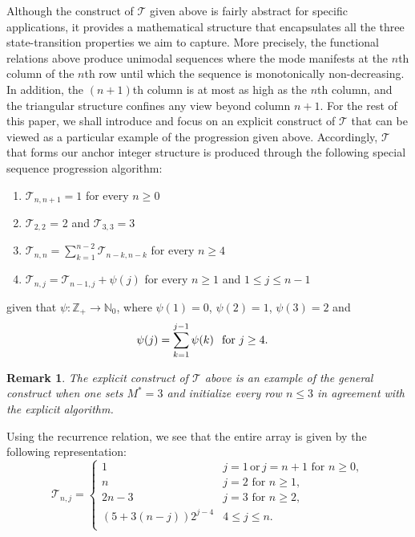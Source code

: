 \documentclass[a4paper,12pt]{article}
\newtheorem{rem}[thm]{Remark}
\def\N{\mathbb{N}}
\def\Z{\mathbb{Z}}
\def\T{\mathcal{T}}
\begin{document}
Although the construct of $\T$ given above is fairly abstract for specific applications, it provides a mathematical structure that encapsulates all the three state-transition properties we aim to capture. More precisely, the functional relations above produce unimodal sequences where the mode manifests at the $n$th column of the $n$th row until which the sequence is monotonically non-decreasing. In addition, the $(n+1)$th column is at most as high as the $n$th column, and the triangular structure confines any view beyond column $n+1$. For the rest of this paper, we shall introduce and focus on an explicit construct of $\T$ that can be viewed as a particular example of the progression given above. Accordingly, $\T$ that forms our anchor integer structure is produced through the following special sequence progression algorithm:
\begin{enumerate}
\label{algorithm1}
\item $\T_{n,n+1} = 1$ for every $n \geq 0$
\item $\T_{2,2}$ = 2 and $\T_{3,3} = 3$
\item $\T_{n,n} = \sum_{k=1}^{n-2} \T_{n-k,n-k}$ for every $n \geq 4$
\item $\T_{n,j} = \T_{n-1,j} + \psi(j)$ for every $n \geq 1$ and $1 \leq j \leq n-1$
\end{enumerate}
given that $\psi: \Z_+ \rightarrow \N_0$, where 
$\psi(1) = 0$, $\psi(2) = 1$, $\psi(3) = 2$ and
\begin{align}
&\psi(j) = \sum_{k=1}^{j-1} \psi(k) \hspace{0.1in} \text{for $j \geq 4$}. \label{columnprogressionfunc}
\end{align}
\begin{rem}
The explicit construct of $\T$ above is an example of the general construct when one sets $M^* = 3$ and initialize every row $n \leq 3$ in agreement with the explicit algorithm.
\end{rem}
Using the recurrence relation, we see that the entire array is given by the following representation:
\begin{equation}
\label{algorithmentire}
\T_{n,j} =
\begin{cases}
1 & j = 1 \, \text{or} \, j = n+1 \,\, \text{for} \,\, n\geq 0,\\
n & j = 2 \,\, \text{for} \,\, n\geq 1, \\
2n - 3 & j = 3 \,\, \text{for} \,\, n\geq 2,\\
\left(5 + 3(n-j)\right)2^{j-4} & 4 \leq j \leq n. \\
\end{cases}
\end{equation}
\end{document}

